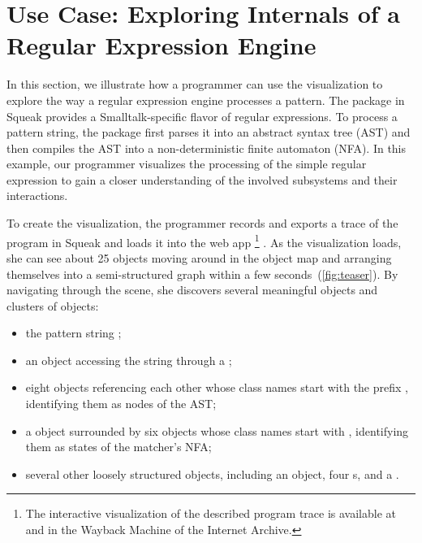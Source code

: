 \section{Use Case: Exploring Internals of a Regular Expression Engine}
\label{sec:use_case}

In this section, we illustrate how a programmer can use the \tfd{} visualization to explore the way a regular expression engine processes a pattern.
The  package in Squeak provides a Smalltalk-specific flavor of regular expressions.
To process a pattern string, the package first parses it into an abstract syntax tree (AST) and then compiles the AST into a non-deterministic finite automaton (NFA).
In this example, our programmer visualizes the processing of the simple regular expression  to gain a closer understanding of the involved subsystems and their interactions.

To create the visualization, the programmer records and exports a trace of the program  in Squeak and loads it into the \tfd{} web app%
\footnote{The interactive visualization of the described program trace is available at  and in the Wayback Machine of the Internet Archive.}%
.
As the visualization loads, she can see about 25 objects moving around in the object map and arranging themselves into a semi-structured graph within a few seconds~(\cref{fig:teaser}).
By navigating through the scene, she discovers several meaningful objects and clusters of objects:

\begin{itemize}
	\item the pattern string ;
	\item an  object accessing the string through a ;
	\item eight objects referencing each other whose class names start with the prefix , identifying them as nodes of the AST;
	\item a  object surrounded by six objects whose class names start with , identifying them as states of the matcher's NFA;
	\item several other loosely structured objects, including an  object, four s, and a .
\end{itemize}

